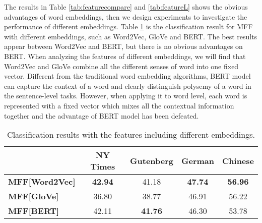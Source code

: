 The results in Table \ref{tab:featurecompare} and \ref{tab:featureL} shows the obvious advantages of word embeddings, 
then we design experiments to investigate the performance of different embeddings.
Table \ref{tab:embedding} is the classification result for MFF with different embeddings, such as Word2Vec, GloVe and BERT.
The best results appear between Word2Vec and BERT, but there is no obvious advantages on BERT.
When analyzing the features of different embeddings, we will find that Word2Vec and GloVe combine all the different senses of word into one fixed vector. 
Different from the traditional word embedding algorithms, BERT model can capture the context of a word and clearly distinguish polysemy of a word in the sentence-level tasks.
However, when applying it to word level,  each word is represented with a fixed vector which mixes all the contextual information together and the advantage of BERT model has been defeated.
\begin{table}[ht]
	\scriptsize
	\setlength{\abovecaptionskip}{0pt}
		\setlength{\belowcaptionskip}{0pt}
	\begin{center}
		\begin{tabular}{lcccc}
		\toprule[1pt]
		\textbf{}            & \textbf{NY Times}& \textbf{Gutenberg} & \textbf{German} & \textbf{Chinese} \\
		\midrule
		\textbf{MFF[Word2Vec]} &   \textbf{42.94 } & 41.18  & \textbf{47.74 } &   \textbf{56.96}    \\ 
		\textbf{MFF[GloVe]} &    36.80  & 38.77  & 46.91  &   56.22   \\ 
		\textbf{MFF[BERT]}     &   42.11  & \textbf{41.76 } & 46.30  &  53.78   \\ 
		\bottomrule[1pt]
	\end{tabular}
	\end{center}
\caption{\label{tab:embedding} Classification results with the features including different embeddings.}
\end{table}

